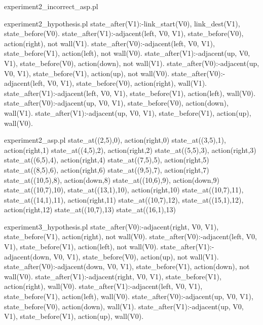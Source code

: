 \begin{filecontents*}{experiment2_incorrect_asp.pl}

\end{filecontents*}

\begin{filecontents*}{experiment2_hypothesis.pl}
state_after(V1):-link_start(V0), link_dest(V1), 
                 state_before(V0).
state_after(V1):-adjacent(left, V0, V1), state_before(V0),
                 action(right), not wall(V1).
state_after(V0):-adjacent(left, V0, V1), state_before(V1),
                 action(left), not wall(V0).
state_after(V1):-adjacent(up, V0, V1), state_before(V0),
                 action(down), not wall(V1).
state_after(V0):-adjacent(up, V0, V1), state_before(V1),
                 action(up), not wall(V0).
state_after(V0):-adjacent(left, V0, V1), state_before(V0),
                 action(right), wall(V1).
state_after(V1):-adjacent(left, V0, V1), state_before(V1),
                 action(left), wall(V0).
state_after(V0):-adjacent(up, V0, V1), state_before(V0),
                 action(down), wall(V1).
state_after(V1):-adjacent(up, V0, V1), state_before(V1),
                 action(up), wall(V0).
\end{filecontents*}

\begin{filecontents*}{experiment2_asp.pl}
state_at((2,5),0), action(right,0)
state_at((3,5),1), action(right,1)
state_at((4,5),2), action(right,2)
state_at((5,5),3), action(right,3)
state_at((6,5),4), action(right,4)
state_at((7,5),5), action(right,5)
state_at((8,5),6), action(right,6)
state_at((9,5),7), action(right,7)
state_at((10,5),8), action(down,8)
state_at((10,6),9), action(down,9)
state_at((10,7),10), state_at((13,1),10), action(right,10)
state_at((10,7),11), state_at((14,1),11), action(right,11)
state_at((10,7),12), state_at((15,1),12), action(right,12)
state_at((10,7),13)
state_at((16,1),13)
\end{filecontents*}

\begin{filecontents*}{experiment3_hypothesis.pl}
state_after(V0):-adjacent(right, V0, V1), state_before(V1), 
                 action(right), not wall(V0).
state_after(V0):-adjacent(left, V0, V1), state_before(V1), 
                 action(left), not wall(V0).
state_after(V1):-adjacent(down, V0, V1), state_before(V0), 
                 action(up), not wall(V1).
state_after(V0):-adjacent(down, V0, V1), state_before(V1), 
                 action(down), not wall(V0).
state_after(V1):-adjacent(right, V0, V1), state_before(V1), 
                 action(right), wall(V0).
state_after(V1):-adjacent(left, V0, V1), state_before(V1), 
                 action(left), wall(V0).
state_after(V0):-adjacent(up, V0, V1), state_before(V0), 
                 action(down), wall(V1).
state_after(V1):-adjacent(up, V0, V1), state_before(V1), 
                 action(up), wall(V0).
\end{filecontents*}
  
